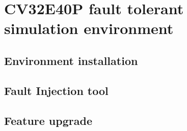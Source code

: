 \chapter{CV32E40P fault tolerant simulation environment}{
	
	
	\section{Environment installation}{
		
	}%
	
	\section{Fault Injection tool}{
	
	}%
	
	\section{Feature upgrade}{
		
	}%

} %